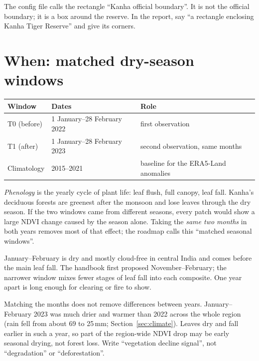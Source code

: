 \begin{watchout}
The config file calls the rectangle ``Kanha official boundary''. It is not the official boundary; it is a box around the reserve. In the report, say ``a rectangle enclosing Kanha Tiger Reserve'' and give its corners.
\end{watchout}

\section{When: matched dry-season windows}

\begin{table}[H]
\centering
\begin{tabular}{lll}
\toprule
Window & Dates & Role \\
\midrule
T0 (before) & 1 January--28 February 2022 & first observation \\
T1 (after) & 1 January--28 February 2023 & second observation, same months \\
Climatology & 2015--2021 & baseline for the ERA5-Land anomalies \\
\bottomrule
\end{tabular}
\end{table}

\emph{Phenology} is the yearly cycle of plant life: leaf flush, full canopy, leaf fall. Kanha's deciduous forests are greenest after the monsoon and lose leaves through the dry season. If the two windows came from different seasons, every patch would show a large NDVI change caused by the season alone. Taking the \emph{same two months} in both years removes most of that effect; the roadmap calls this ``matched seasonal windows''.

\begin{whybox}
January--February is dry and mostly cloud-free in central India and comes before the main leaf fall. The handbook first proposed November--February; the narrower window mixes fewer stages of leaf fall into each composite. One year apart is long enough for clearing or fire to show.
\end{whybox}

\begin{watchout}
Matching the months does not remove differences between years. January--February 2023 was much drier and warmer than 2022 across the whole region (rain fell from about 69 to 25\,mm; Section~\ref{sec:climate}). Leaves dry and fall earlier in such a year, so part of the region-wide NDVI drop may be early seasonal drying, not forest loss. Write ``vegetation decline signal'', not ``degradation'' or ``deforestation''.
\end{watchout}


